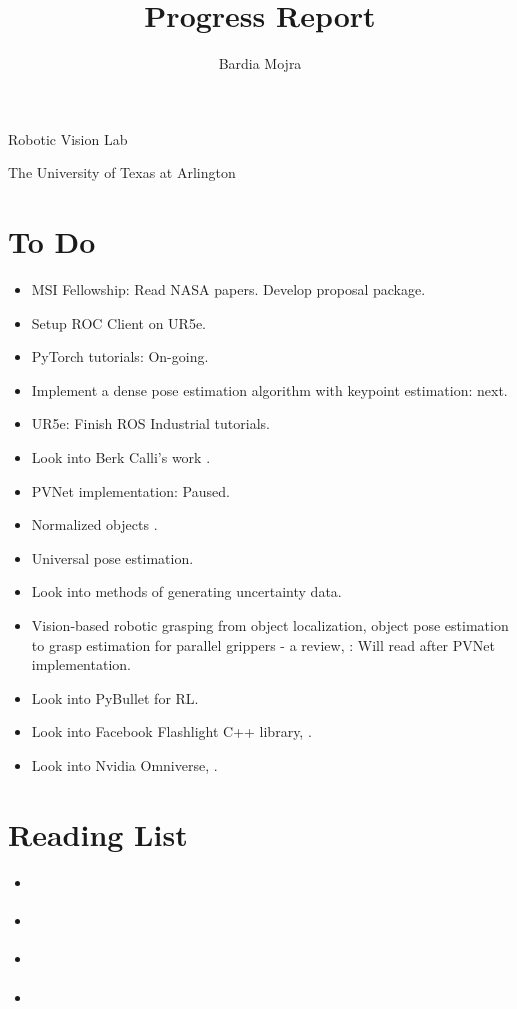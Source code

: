 \documentclass[11pt]{article}
\title{Progress Report}
\author{Bardia Mojra}
\begin{document}
\maketitle
\thispagestyle{empty}

\bigskip
\bigskip
\begin{center}
      Robotic Vision Lab
\end{center}

\begin{center}
      The University of Texas at Arlington
\end{center}

\newpage

\section{To Do}
\begin{itemize}
      \item MSI Fellowship: Read NASA papers. Develop proposal package.
      \item Setup ROC Client on UR5e.
      \item PyTorch tutorials: On-going.
      \item Implement a dense pose estimation algorithm with keypoint estimation:
      next.
      \item UR5e: Finish ROS Industrial tutorials.
      \item Look into Berk Calli's work \cite{calli2015ycb}.
      \item PVNet implementation: Paused.
      \item Normalized objects \cite{Wang_2019_CVPR}.
      \item Universal pose estimation.
      \item Look into methods of generating uncertainty data.
      \item Vision-based robotic grasping from object localization, object pose
      estimation to grasp estimation for parallel grippers - a review,
      \cite{du2020vision}: Will read after PVNet implementation.
      \item Look into PyBullet for RL.
      \item Look into Facebook Flashlight C++ library, \cite{flashlig35:online}.
      \item Look into Nvidia Omniverse, \cite{NVIDIAOm1:online}.
\end{itemize}

\section{Reading List}
\begin{itemize}
      \item \cite{roadmap251:online}
      \item \cite{ferraz2014leveraging}
      \item \cite{he2015deep}
      \item \cite{du2020vision}
\end{itemize}
\end{document}
